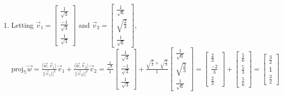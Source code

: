 \documentclass[10pt,english]{article}
\begin{document}
\begin{enumerate}
\begin{enumerate}
    \item Letting $\vec{v}_1=\begin{bmatrix}\frac{1}{\sqrt{3}}\\\frac{-1}{\sqrt{3}}\\\frac{1}{\sqrt{3}}\end{bmatrix}$ and $\vec{v}_2=\begin{bmatrix}\frac{1}{\sqrt{6}}\\\sqrt{\frac{2}{3}}\\\frac{1}{\sqrt{6}}\end{bmatrix}$, $\text{proj}_\mathbb{S}\vec{w}=\frac{\langle\vec{w},\vec{v}_1\rangle}{||\vec{v}_1||^2}\vec{v}_1+\frac{\langle\vec{w},\vec{v}_2\rangle}{||\vec{v}_2||^2}\vec{v}_2=\frac{\frac{2}{\sqrt{3}}}{1}\begin{bmatrix}\frac{1}{\sqrt{3}}\\\frac{-1}{\sqrt{3}}\\\frac{1}{\sqrt{3}}\end{bmatrix}+\frac{\sqrt{\frac{3}{2}}+\sqrt{\frac{2}{3}}}{1}\begin{bmatrix}\frac{1}{\sqrt{6}}\\\sqrt{\frac{2}{3}}\\\frac{1}{\sqrt{6}}\end{bmatrix}=\begin{bmatrix}\frac{2}{3}\\\frac{-2}{3}\\\frac{2}{3}\end{bmatrix}+\begin{bmatrix}\frac{5}{6}\\\frac{5}{3}\\\frac{5}{6}\end{bmatrix}=\begin{bmatrix}\frac{3}{2}\\1\\\frac{3}{2}\end{bmatrix}$

\end{enumerate}
\end{enumerate}
\end{document}
